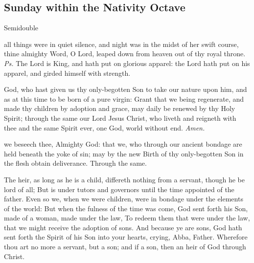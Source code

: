 \subsection{Sunday within the Nativity Octave}
\fancyhead[RE,LO]{}
\begin{inhead}
{Semidouble}
\end{inhead}


\vspace{-0.5\baselineskip}

\introit
{} all things were in quiet silence, and night was in the midst of her swift course, thine almighty Word, O Lord, leaped down from heaven out of thy royal throne. \textit{Ps.} The Lord is King, and hath put on glorious apparel: the Lord hath put on his apparel, and girded himself with strength.

\collect
{} God, who hast given us thy only-begotten Son to take our nature upon him, and as at this time to be born of a pure virgin: Grant that we being regenerate, and made thy children by adoption and grace, may daily be renewed by thy Holy Spirit; through the same our Lord Jesus Christ, who liveth and reigneth with thee and the same Spirit ever, one God, world without end. \textit{Amen.}

 we beseech thee, Almighty God: that we, who through our ancient bondage are held beneath the yoke of sin; may by the new Birth of thy only-begotten Son in the flesh obtain deliverance. Through the same.

 The heir, as long as he is a child, differeth nothing from a servant, though he be lord of all; But is under tutors and governors until the time appointed of the father. Even so we, when we were children, were in bondage under the elements of the world: But when the fulness of the time was come, God sent forth his Son, made of a woman, made under the law, To redeem them that were under the law, that we might receive the adoption of sons. And because ye are sons, God hath sent forth the Spirit of his Son into your hearts, crying, Abba, Father. Wherefore thou art no more a servant, but a son; and if a son, then an heir of God through Christ.

